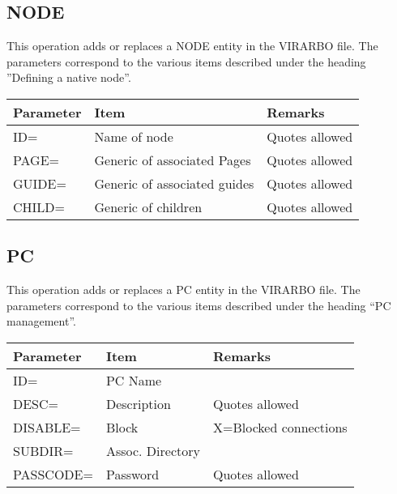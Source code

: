 \documentclass[letterpaper,10pt,english]{sphinxmanual}
\begin{document}
\subsection{NODE}
\label{\detokenize{Installation_Guide:node}}\label{\detokenize{Installation_Guide:index-166}}
This operation adds or replaces a NODE entity in the VIRARBO file. The parameters correspond to the various items described under the heading ”Defining a native node”.


\begin{savenotes}\sphinxattablestart
\centering
\begin{tabulary}{\linewidth}[t]{|T|T|T|}
\hline
\sphinxstyletheadfamily 
Parameter
&\sphinxstyletheadfamily 
Item
&\sphinxstyletheadfamily 
Remarks
\\
\hline
ID=
&
Name of node
&
Quotes allowed
\\
\hline
PAGE=
&
Generic of associated Pages
&
Quotes allowed
\\
\hline
GUIDE=
&
Generic of associated guides
&
Quotes allowed
\\
\hline
CHILD=
&
Generic of children
&
Quotes allowed
\\
\hline
\end{tabulary}
\par
\sphinxattableend\end{savenotes}

\ignorespaces 

\subsection{PC}
\label{\detokenize{Installation_Guide:pc}}\label{\detokenize{Installation_Guide:index-167}}
This operation adds or replaces a PC entity in the VIRARBO file. The parameters correspond to the various items described under the heading “PC management”.


\begin{savenotes}\sphinxattablestart
\centering
\begin{tabulary}{\linewidth}[t]{|T|T|T|}
\hline
\sphinxstyletheadfamily 
Parameter
&\sphinxstyletheadfamily 
Item
&\sphinxstyletheadfamily 
Remarks
\\
\hline
ID=
&
PC Name
&\\
\hline
DESC=
&
Description
&
Quotes allowed
\\
\hline
DISABLE=
&
Block
&
X=Blocked connections
\\
\hline
SUBDIR=
&
Assoc. Directory
&\\
\hline
PASSCODE=
&
Password
&
Quotes allowed
\\
\hline
\end{tabulary}
\par
\sphinxattableend\end{savenotes}
\end{document}
